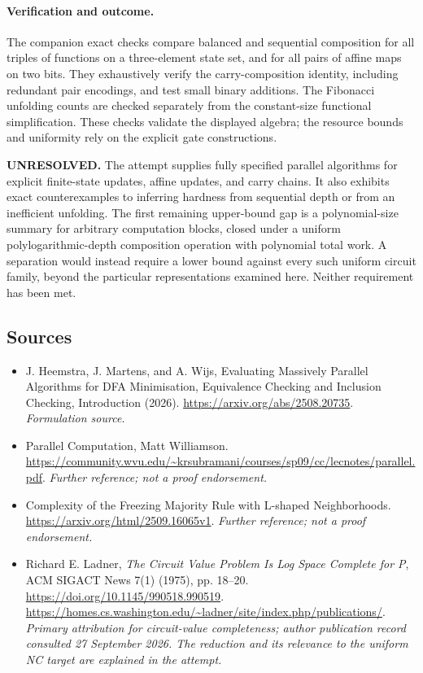 \documentclass[11pt]{article}
\begin{document}
\paragraph{Verification and outcome.}
The companion exact checks compare balanced and sequential composition for
all triples of functions on a three-element state set, and for all pairs
of affine maps on two bits. They exhaustively verify the carry-composition
identity, including redundant pair encodings, and test small binary additions.
The Fibonacci unfolding counts are checked separately from the constant-size
functional simplification. These checks validate the displayed algebra;
the resource bounds and uniformity rely on the explicit gate constructions.

\textbf{UNRESOLVED.} The attempt supplies fully specified parallel algorithms
for explicit finite-state updates, affine updates, and carry chains. It also
exhibits exact counterexamples to inferring hardness from sequential depth
or from an inefficient unfolding. The first remaining upper-bound gap is a
polynomial-size summary for arbitrary computation blocks, closed under a
uniform polylogarithmic-depth composition operation with polynomial total
work. A separation would instead require a lower bound against every such
uniform circuit family, beyond the particular representations examined here.
Neither requirement has been met.

\subsection{Sources}
\begin{itemize}
\item[S1]J. Heemstra, J. Martens, and A. Wijs, Evaluating Massively Parallel Algorithms for DFA Minimisation, Equivalence Checking and Inclusion Checking, Introduction (2026).
\url{https://arxiv.org/abs/2508.20735}.
\textit{Formulation source.}
\item[S2]Parallel Computation, Matt Williamson.
\url{https://community.wvu.edu/~krsubramani/courses/sp09/cc/lecnotes/parallel.pdf}.
\textit{Further reference; not a proof endorsement.}
\item[S3]Complexity of the Freezing Majority Rule with L-shaped Neighborhoods.
\url{https://arxiv.org/html/2509.16065v1}.
\textit{Further reference; not a proof endorsement.}
\item[E1]Richard E. Ladner,
\emph{The Circuit Value Problem Is Log Space Complete for P},
ACM SIGACT News 7(1) (1975), pp. 18--20.
\url{https://doi.org/10.1145/990518.990519}.
\url{https://homes.cs.washington.edu/~ladner/site/index.php/publications/}.
\textit{Primary attribution for circuit-value completeness; author publication
record consulted 27 September 2026. The reduction and its relevance to the
uniform NC target are explained in the attempt.}
\end{itemize}
\end{document}
